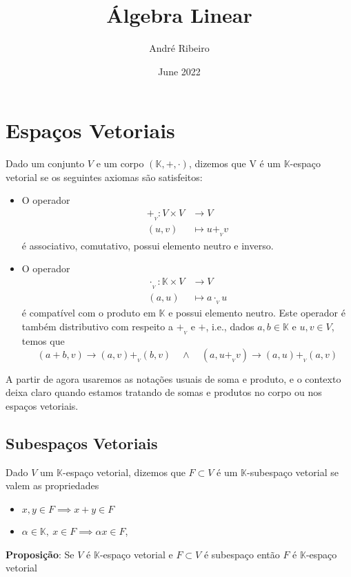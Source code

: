 \documentclass{article}
\title{Álgebra Linear}
\author{André Ribeiro}
\date{June 2022}
\newcommand{\K}{\mathbb{K}}
\begin{document}
\maketitle

\tableofcontents

\newpage

\section{Espaços Vetoriais}

Dado um conjunto $V$ e um corpo $(\K, +, \cdot)$, dizemos que V é um $\K$-espaço vetorial se os seguintes axiomas são satisfeitos:

\begin{itemize}
    \item O operador
    \begin{align*}
        +_{_V} : V \times V &\to V \\
              (u, v) &\mapsto u +_{_V} v
    \end{align*} 
    é associativo, comutativo, possui elemento neutro e inverso.
    \item O operador 
    \begin{align*}
        \cdot_{_V} : \K \times V &\to V \\
                   (a, u) &\mapsto a \cdot_{_V} u
    \end{align*} 
    é compatível com o produto em $\K$ e possui elemento neutro. Este operador é também distributivo com respeito a $+_{_V}$ e $+$, i.e., dados $a, b \in \K$ e $u, v \in V$, temos que \[ (a + b, v) \to (a, v) +_{_V} (b, v) \quad \land \quad (a, u +_{_V} v) \to (a, u) +_{_V} (a, v)  \]
\end{itemize}

A partir de agora usaremos as notações usuais de soma e produto, e o contexto deixa claro quando estamos tratando de somas e produtos no corpo ou nos espaços vetoriais.

\subsection{Subespaços Vetoriais}

Dado $V$ um $\K$-espaço vetorial, dizemos que $F \subset V$ é um $\K$-subespaço vetorial se valem as propriedades
\begin{itemize}
    \item $x, y \in F \implies x + y \in F$
    \item $\alpha \in \K,\: x \in F \implies \alpha x \in F$, 
\end{itemize} \vspace{3mm}
\textbf{Proposição}: Se $V$ é $\K$-espaço vetorial e $F \subset V$ é subespaço então $F$ é $\K$-espaço vetorial
\end{document}
